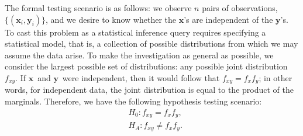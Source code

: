 \documentclass[11pt]{article}
\providecommand{\mb}[1]{\boldsymbol{#1}}
\newcommand{\Real}{\mathbb{R}}
\newcommand{\mbx}{\ensuremath{\mb{x}}}
\newcommand{\mby}{\ensuremath{\mb{y}}}
\begin{document}
The formal testing scenario is as follows: we observe $n$ pairs of observations, $\{(\mbx_i,\mby_i)\}$, and we desire to know whether the \mbx's are independent of the \mby's.  To cast this problem as a statistical inference query requires specifying a statistical model, that is, a collection of possible distributions from which we may assume the data arise.  To make the investigation as general as possible, we consider the largest possible set of distributions: any possible joint distribution $f_{xy}$. If \mbx~and \mby~were independent, then it would follow that $f_{xy}=f_x f_y$; in other words, for independent data, the joint distribution is equal to the product of the marginals.  Therefore, we have the following hypothesis testing scenario:
\begin{align*}
& H_{0}: f_{xy}=f_{x}f_{y},\\
& H_{A}: f_{xy} \neq f_{x}f_{y}.
\end{align*}
\end{document}

